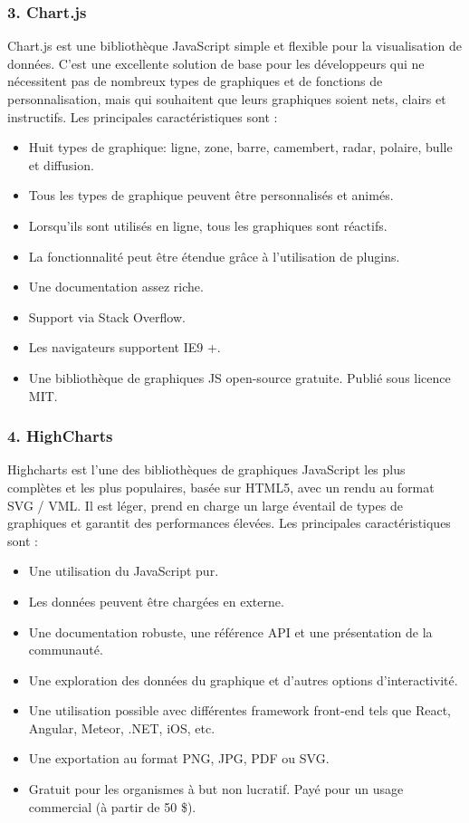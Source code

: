 \documentclass[french, a4paper, 12pt]{report}
\begin{document}
\subsubsection{3. Chart.js}
Chart.js est une bibliothèque JavaScript simple et flexible pour la visualisation de données. C’est une excellente solution de base pour les développeurs qui ne nécessitent pas de nombreux types de graphiques et de fonctions de personnalisation, mais qui souhaitent que leurs graphiques soient nets, clairs et instructifs. Les principales caractéristiques sont : 
\begin{itemize}
\item \textbf{} Huit types de graphique: ligne, zone, barre, camembert, radar, polaire, bulle et diffusion.
\item \textbf{} Tous les types de graphique peuvent être personnalisés et animés.
\item \textbf{}  Lorsqu'ils sont utilisés en ligne, tous les graphiques sont réactifs.
\item \textbf{} La fonctionnalité peut être étendue grâce à l'utilisation de plugins.
\item \textbf{} Une documentation assez riche.
\item \textbf{} Support via Stack Overflow.
\item \textbf{} Les navigateurs supportent IE9 +.
\item \textbf{} Une bibliothèque de graphiques JS open-source gratuite. Publié sous licence MIT.
\end{itemize} 
\subsubsection{4. HighCharts}
Highcharts est l’une des bibliothèques de graphiques JavaScript les plus complètes et les plus populaires, basée sur HTML5, avec un rendu au format SVG / VML. Il est léger, prend en charge un large éventail de types de graphiques et garantit des performances élevées. Les principales caractéristiques sont : 
\begin{itemize}
\item \textbf{} Une utilisation du JavaScript pur. 
\item \textbf{} Les données peuvent être chargées en externe.
\item \textbf{} Une documentation robuste, une référence API et une présentation de la communauté.
\item \textbf{} Une exploration des données du graphique et d'autres options d'interactivité.
\item \textbf{} Une utilisation possible avec différentes framework front-end tels que React, Angular, Meteor, .NET, iOS, etc.
\item \textbf{} Une exportation au format PNG, JPG, PDF ou SVG.
\item \textbf{} Gratuit pour les organismes à but non lucratif. Payé pour un usage commercial (à partir de 50 \$).
\end{itemize} 
\end{document}
